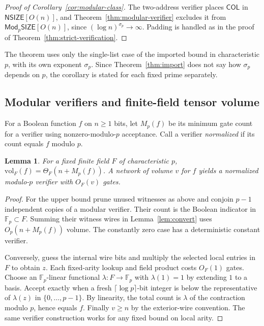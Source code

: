 \documentclass[11pt]{article}
\newtheorem{lemma}[theorem]{Lemma}
\theoremstyle{definition}
\theoremstyle{remark}
\newcommand{\vol}{\mathrm{vol}}
\newcommand{\F}{\mathbb{F}}
\newcommand{\NSIZE}{\mathsf{NSIZE}}
\newcommand{\ModSIZE}[1]{\mathsf{Mod}_{#1}\mathsf{SIZE}}
\begin{document}
\begin{proof}[Proof of Corollary~\ref{cor:modular-class}]
The two-address verifier places $\mathsf{COL}$ in $\NSIZE[O(n)]$, and
Theorem~\ref{thm:modular-verifier} excludes it from $\ModSIZE{p}[O(n)]$,
since $(\log n)^{\sigma_p}\to\infty$. Padding is handled as in the proof
of Theorem~\ref{thm:strict-verification}.
\end{proof}

The theorem uses only the single-list case of the imported bound in
characteristic $p$, with its own exponent $\sigma_p$. Since
Theorem~\ref{thm:import} does not say how $\sigma_p$ depends on $p$, the
corollary is stated for each fixed prime separately.

\subsection{Modular verifiers and finite-field tensor volume}
For a Boolean function $f$ on $n\ge1$ bits, let $M_p(f)$ be its
minimum gate count for a verifier using nonzero-modulo-$p$ acceptance.
Call a verifier \emph{normalized} if its count equals $f$ modulo $p$.

\begin{lemma}\label{lem:mod-volume}
For a fixed finite field $F$ of characteristic $p$,
$\vol_F(f)=\Theta_F(n+M_p(f))$. A network of volume $v$ for $f$
yields a normalized modulo-$p$ verifier with $O_F(v)$ gates.
\end{lemma}
\begin{proof}
For the upper bound prune unused witnesses as above and conjoin $p-1$
independent copies of a modular verifier. Their count is the Boolean
indicator in $\F_p\subset F$. Summing their witness wires in
Lemma~\ref{lem:convert} uses $O_p(n+M_p(f))$ volume. The constantly
zero case has a deterministic constant verifier.

Conversely, guess the internal wire bits and multiply the selected
local entries in $F$ to obtain $z$. Each fixed-arity lookup and field
product costs $O_F(1)$ gates. Choose an $\F_p$-linear functional
$\lambda:F\to\F_p$ with $\lambda(1)=1$ by extending $1$ to a basis.
Accept exactly when a fresh $\lceil\log p\rceil$-bit integer is below
the representative of $\lambda(z)$ in $\{0,\ldots,p-1\}$. By
linearity, the total count is $\lambda$ of the contraction modulo $p$,
hence equals $f$. Finally $v\ge n$ by the exterior-wire convention.
The same verifier construction works for any fixed bound on local arity.
\end{proof}
\end{document}
